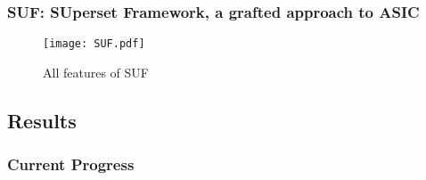 \begin{frame}
    \frametitle{SUF: SUperset Framework, a grafted approach to ASIC}
\begin{figure}
	\centering
	\texttt{[image: SUF.pdf]}
	\caption{All features of SUF}
\end{figure}

\end{frame}

\subsection{Results}
\begin{frame}
    \frametitle{Current Progress}

    \tableofcontents[currentsection,
                     subsectionstyle=show/shaded/hide,
                     sectionstyle=show/hide]

\end{frame}

%

